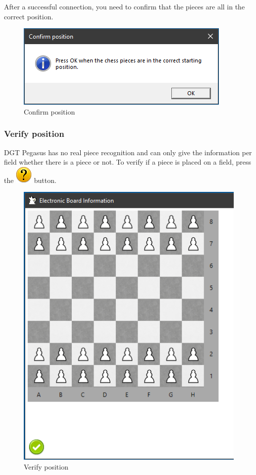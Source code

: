 \documentclass[11pt,a4paper]{article}
\begin{document}
After a successful connection, you need to confirm that the pieces are all in the correct position.

\begin{figure}[H]
	\centering
	\includegraphics[scale=0.8]{Pegasus4.png}
	\caption{Confirm position}
	\label{fig:Pegasus4}
\end{figure}

\subsubsection{Verify position} \label{VerifyPegasusPosition}
DGT Pegasus has no real piece recognition and can only give the information per field whether there is a piece or not. To verify if a piece is placed on a field, press the  \includegraphics[scale=0.4]{emotion_question.png} button.

\begin{figure}[H]
	\centering
	\includegraphics[scale=0.8]{Pegasus5.png}
	\caption{Verify position}
	\label{fig:Pegasus5}
\end{figure}
\end{document}
